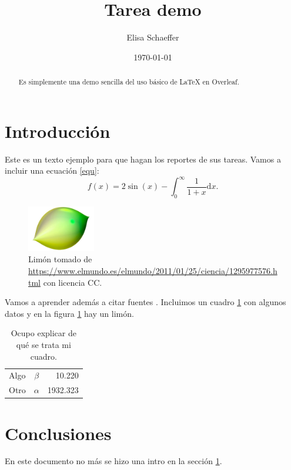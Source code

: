 \documentclass{article}
\author{Elisa Schaeffer} %
\title{Tarea demo} %
\date{\today}
\begin{document}

\maketitle %

\begin{abstract} %
  Es simplemente una demo sencilla del uso b\'{a}sico de \LaTeX{} en
  Overleaf.
\end{abstract}

\section{Introducci\'{o}n}\label{intro} %



Este es un texto ejemplo para que hagan los reportes de sus
tareas. Vamos a incluir una ecuaci\'{o}n \eqref{equ}:
\begin{equation}
  f(x) = 2 \sin(x) - \int_0^\infty \frac{1}{1 + x} \text{d}x.
  \label{equ}
\end{equation}

\begin{figure} %
    \centering
    \includegraphics[width=30mm]{limon.jpg} %
    \caption{Lim\'{o}n tomado de \url{https://www.elmundo.es/elmundo/2011/01/25/ciencia/1295977576.html} con licencia CC.}
    \label{limon}
\end{figure}

\newpage

Vamos a aprender adem\'{a}s a citar fuentes \citep{ejemplo}. Incluimos un
cuadro \ref{datos} con algunos datos y en la figura \ref{limon} hay un
lim\'{o}n.

\begin{table} %
    \caption{Ocupo explicar de qu\'{e} se trata mi cuadro.} %
    \label{datos} %
    \centering %
    \begin{tabular}{l|cr} %
         Algo & $\beta$ & 10.220 \\
         Otro & $\alpha$ & 1932.323
    \end{tabular}
\end{table}

\section{Conclusiones}

En este documento no m\'{a}s se hizo una intro en la secci\'{o}n \ref{intro}.



\end{document}
